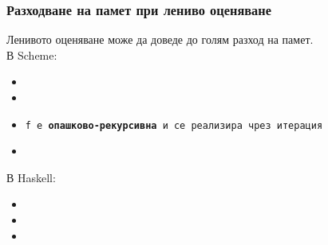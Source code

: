 \documentclass[alsotrans,beameroptions={aspectratio=169}]{beamerswitch}
\begin{document}
\begin{frame}
  \frametitle{Разходване на памет при лениво оценяване}

  Ленивото оценяване може да доведе до голям разход на памет.\\[1em]\pause
  В Scheme:
  \lstset{language=Scheme}
  \begin{itemize}[<+->]
  \item {}
  \item {}
  \item \tt f е \textbf{опашково-рекурсивна} и се реализира чрез итерация
  \item {}
  \end{itemize}
  \onslide<+->
  В Haskell:
  \lstset{language=Haskell}
  \begin{itemize}[<+->]
  \item {}
  \item {}
  \item {}
  \end{itemize}
\end{frame}
\end{document}
